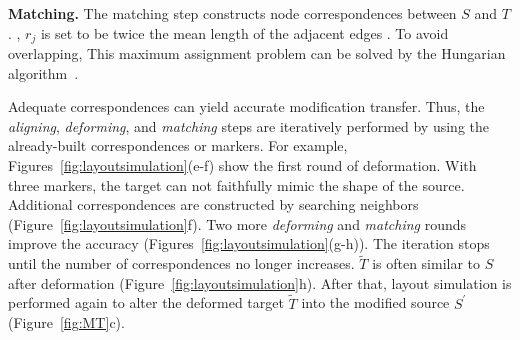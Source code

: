 \textbf{Matching.}
The matching step constructs node correspondences between $S$ and $T$.
  , $r_j$ is set to be twice the mean length of the adjacent edges .
To avoid overlapping,  This maximum assignment problem can be solved by the Hungarian algorithm~\cite{kuhn1955hungarian, kuhn1956variants}. 


Adequate correspondences can yield accurate modification transfer.
Thus, the \textit{aligning}, \textit{deforming}, and \textit{matching} steps are iteratively performed by using the already-built correspondences or markers. 
For example, Figures~\ref{fig:layoutsimulation}(e-f) show the first round of deformation. With three markers, the target can not faithfully mimic the shape of the source. Additional correspondences are constructed by searching neighbors (Figure~\ref{fig:layoutsimulation}f). Two more \textit{deforming} and \textit{matching} rounds improve the accuracy (Figures~\ref{fig:layoutsimulation}(g-h)). The iteration stops until the number of correspondences
no longer increases. 
$\tilde{T}$ is often similar to $S$ after deformation (Figure~\ref{fig:layoutsimulation}h). After that, layout simulation is performed again to alter the deformed target $\tilde{T}$ into the modified source $S^{\prime}$ (Figure~\ref{fig:MT}c).


